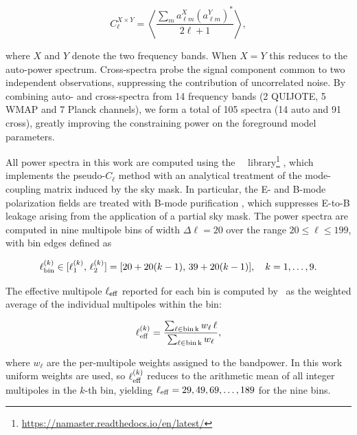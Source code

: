 \begin{equation}
    \label{eq:cl_cross}
    C_{\ell}^{X \times Y} = \left\langle \frac{\sum_{m} a_{\ell m}^{X} (a_{\ell m}^{Y})^{*}}{2\ell + 1} \right\rangle,
\end{equation}

where $X$ and $Y$ denote the two frequency bands. When $X = Y$ this reduces to the auto-power spectrum. Cross-spectra probe the signal component common to two independent observations, suppressing the contribution of uncorrelated noise. By combining auto- and cross-spectra from 14 frequency bands (2 QUIJOTE, 5 WMAP and 7 Planck channels), we form a total of 105 spectra (14 auto and 91 cross), greatly improving the constraining power on the foreground model parameters.

All power spectra in this work are computed using the \namaster\ \python\ library\footnote{\url{https://namaster.readthedocs.io/en/latest/}} \citep{Namaster}, which implements the pseudo-$C_\ell$ method with an analytical treatment of the mode-coupling matrix induced by the sky mask. In particular, the E- and B-mode polarization fields are treated with B-mode purification \citep{Smith_2006}, which suppresses E-to-B leakage arising from the application of a partial sky mask. The power spectra are computed in nine multipole bins of width $\Delta\ell = 20$ over the range $20 \leq \ell \leq 199$, with bin edges defined as

\begin{equation}
    \ell_{\rm bin}^{(k)} \in [\ell_1^{(k)},\, \ell_2^{(k)}] = [20 + 20(k-1),\, 39 + 20(k-1)], \quad k = 1, \ldots, 9.
\end{equation}

The effective multipole $\ell_{\rm eff}$ reported for each bin is computed by \namaster\ as the weighted average of the individual multipoles within the bin:

\begin{equation}
    \ell_{\rm eff}^{(k)} = \frac{\sum_{\ell \in \rm bin\,k} w_\ell\, \ell}{\sum_{\ell \in \rm bin\,k} w_\ell},
\end{equation}

where $w_\ell$ are the per-multipole weights assigned to the bandpower. In this work uniform weights are used, so $\ell_{\rm eff}^{(k)}$ reduces to the arithmetic mean of all integer multipoles in the $k$-th bin, yielding $\ell_{\rm eff} = 29, 49, 69, \ldots, 189$ for the nine bins.


